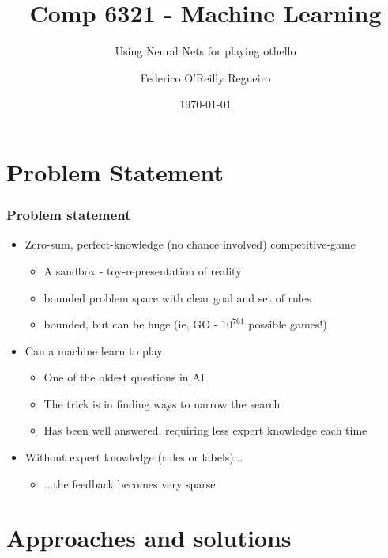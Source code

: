 \documentclass{beamer}
\title{Comp 6321 - Machine Learning}
\subtitle{Using Neural Nets for playing othello}
\author{Federico O'Reilly Regueiro}
\institute{Concordia University}
\date{\today}
\begin{document}
\begin{frame}
\titlepage
\end{frame}


\section{Problem Statement}
\begin{frame}
\frametitle{Problem statement}

\begin{itemize}
\item<1->Zero-sum, perfect-knowledge (no chance involved) competitive-game\\
\begin{itemize}
\item<2,3,4>A sandbox - toy-representation of reality
\item<3,4>bounded problem space with clear goal and set of rules
\item<4>bounded, but can be huge (ie, GO - $10^{761}$ possible games!) \cite{AlphaGo}
\end{itemize}
\item<5->Can a machine learn to play 	
\begin{itemize}
\item<6,7,8>One of the oldest questions in AI
\item<7,8>The trick is in finding ways to narrow the search   
\item<8>Has been well answered, requiring less expert knowledge each  time
\end{itemize}
\item<9->Without expert knowledge (rules or labels)...
\begin{itemize}
\item<10>...the feedback becomes very sparse
\end{itemize}
\end{itemize}
\end{frame}


\section{Approaches and solutions}
\end{document}

